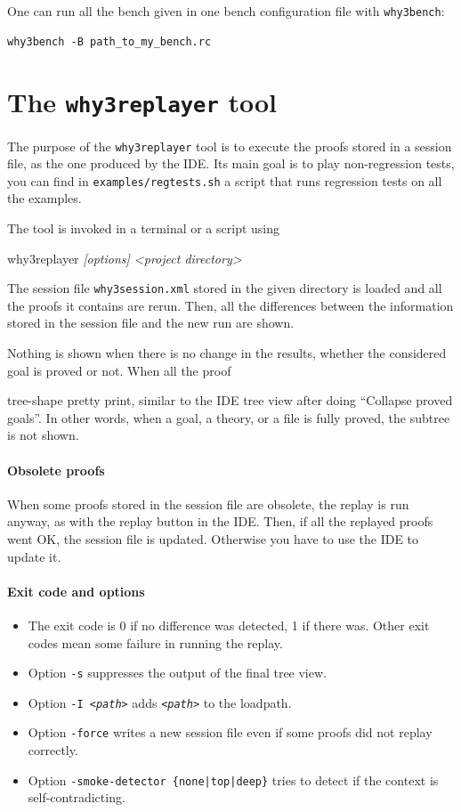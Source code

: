 One can run all the bench given in one bench configuration file with
\texttt{why3bench}:
\begin{verbatim}
why3bench -B path_to_my_bench.rc
\end{verbatim}

\section{The \texttt{why3replayer} tool}
\label{sec:why3replayer}

The purpose of the \texttt{why3replayer} tool is to execute the proofs
stored in a \why session file, as the one produced by the IDE. Its
main goal is to play non-regression tests, \eg you can find in
\texttt{examples/regtests.sh} a script that runs regression tests on
all the examples.

The tool is invoked in a terminal or a script using
\begin{flushleft}\ttfamily
  why3replayer \textsl{[options] <project directory>}
\end{flushleft}
The session file \texttt{why3session.xml} stored in the given
directory is loaded and all the proofs it contains are rerun. Then,
all the differences between the information stored in the session file and
the new run are shown.

Nothing is shown when there is no change in the results, whether the
considered goal is proved or not. When all the proof

tree-shape pretty print, similar to the IDE tree view after doing
``Collapse proved goals''. In other words, when a goal, a theory, or a
file is fully proved, the subtree is not shown.

\paragraph{Obsolete proofs}

When some proofs stored in the session file are obsolete, the replay is
run anyway, as with the replay button in the IDE. Then, if all the
replayed proofs went OK, the session file is updated. Otherwise you have
to use the IDE to update it.

\paragraph{Exit code and options}

\begin{itemize}
\item The exit code is 0 if no difference was detected, 1 if there
  was. Other exit codes mean some failure in running the replay.
\item Option \verb|-s| suppresses the output of the final tree view.
\item Option \texttt{-I \textsl{<path>}} adds \texttt{\textsl{<path>}} to the loadpath.
\item Option \verb|-force| writes a new session file even if
  some proofs did not replay correctly.
\item Option \texttt{-smoke-detector \{none|top|deep\}} tries to detect
  if the context is self-contradicting.
\end{itemize}

